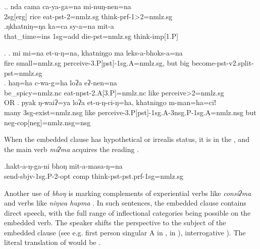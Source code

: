 \ex.\ag. nda cama ca-ya-ga=na mi-nuŋ-nen=na\\
{\sc 2sg[erg]} rice eat-{\sc pst-2=nmlz.sg} think-{\sc prf-1>2=nmlz.sg}\\
\bg.ŋkhatniŋ=ŋa ka=ca sy-a=na mit-a\\
that\_time{\sc =ins} {\sc 1sg=add} die{\sc [3sg]-pst=nmlz.sg} think{\sc -imp[1.P]}\\
 
	

\ex. \ag. mi mi=na et-u-ŋ=na, khatniŋgo ma leks-a-bhoks-a=na\\
	fire small{\sc =nmlz.sg} perceive{\sc -3.P[pst]-1sg.A=nmlz.sg}, but big become{\sc [3sg]-pst-v2.split-pst=nmlz.sg}	\\
	\bg. haŋ=ha c-wa-g=ha loʔa eʔ-nen=na\\
be\_spicy{\sc =nmlz.nc} eat-{\sc npst-2.A[3.P]=nmlz.nc} like perceive{>2=nmlz.sg}  \\
 OR
\bg. pyak ŋ-waiʔ=ya loʔa et-u-ŋ-ci-ŋ=ha, khatniŋgo m-man=ha=ciǃ\\
many {\sc 3sg-}exist{\sc =nmlz.nsg} like perceive{\sc -3.P[pst]-1sg.A-3nsg.P-1sg.A=nmlz.nsg} but {\sc neg-cop[neg]=nmlz.nsg=nsg}\\


When the embedded clause has hypothetical or irrealis status, it is in the ,  and the main verb \emph{miʔma}  acquires the reading .

\exg.hakt-a-ŋ-ga-ni bhoŋ mit-a-masa-ŋ=na\\
send{\sc -sbjv-1sg.P-2-opt} {\sc comp} think{\sc -pst-pst.prf-1sg=nmlz.sg}\\


Another use of \emph{bhoŋ} is marking complements of experiential verbs like \emph{consiʔma}  and verbs like \emph{niŋwa hupma} . In such sentences, the embedded clause contains direct speech, with the full range of inflectional categories being possible on the embedded verb. The speaker shifts the perspective to the subject of the embedded clause (see e.g. first person singular A in \Next[a],   in \Next[b]), interrogative  \Next[c]).  The literal translation of \Next[a] would be . 
 
